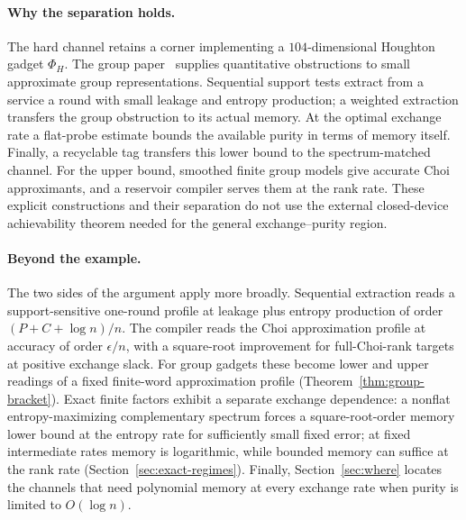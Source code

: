 \documentclass[11pt,a4paper]{article}
\theoremstyle{plain}
\theoremstyle{definition}
\theoremstyle{remark}
\begin{document}
\paragraph{Why the separation holds.}
The hard channel retains a corner implementing a $104$-dimensional Houghton
gadget $\Phi_H$. The group paper~\cite{DouglasMghirbiA} supplies quantitative
obstructions to small approximate group representations. Sequential support
tests extract from a service a round with small leakage and entropy production;
a weighted extraction transfers the group obstruction to its actual memory.
At the optimal exchange rate a flat-probe estimate bounds the available purity
in terms of memory itself. Finally, a recyclable tag transfers this lower bound
to the spectrum-matched channel. For the upper bound, smoothed finite group
models give accurate Choi approximants, and a reservoir compiler serves them
at the rank rate. These explicit constructions and their separation do not
use the external closed-device achievability theorem needed for the general
exchange--purity region.

\paragraph{Beyond the example.}
The two sides of the argument apply more broadly. Sequential extraction reads
a support-sensitive one-round profile at leakage plus entropy production of
order $(P+C+\log n)/n$. The compiler reads the Choi approximation profile at
accuracy of order $\epsilon/n$, with a square-root improvement for full-Choi-rank
targets at positive exchange slack. For group gadgets these become lower and
upper readings of a fixed finite-word approximation profile
(Theorem~\ref{thm:group-bracket}). Exact finite factors exhibit a separate
exchange dependence: a nonflat entropy-maximizing complementary spectrum
forces a square-root-order memory lower bound at the entropy rate for sufficiently
small fixed error; at fixed intermediate rates memory is logarithmic, while
bounded memory can suffice at the rank rate
(Section~\ref{sec:exact-regimes}). Finally, Section~\ref{sec:where} locates the channels that need polynomial memory at every exchange rate when purity is limited
to $O(\log n)$.
\end{document}
